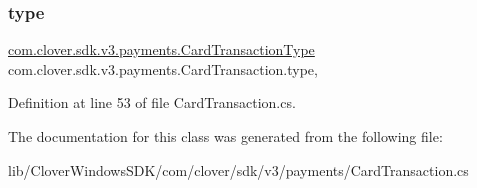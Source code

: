 \subsubsection{\texorpdfstring{type}{type}}
{\footnotesize\ttfamily \hyperlink{namespacecom_1_1clover_1_1sdk_1_1v3_1_1payments_a4207f1c1388f6f392bd998855cc88936}{com.\+clover.\+sdk.\+v3.\+payments.\+Card\+Transaction\+Type} com.\+clover.\+sdk.\+v3.\+payments.\+Card\+Transaction.\+type\hspace{0.3cm}{\ttfamily [get]}, {\ttfamily [set]}}



Definition at line 53 of file Card\+Transaction.\+cs.



The documentation for this class was generated from the following file\+:\begin{DoxyCompactItemize}
\item 
lib/\+Clover\+Windows\+S\+D\+K/com/clover/sdk/v3/payments/Card\+Transaction.\+cs\end{DoxyCompactItemize}
